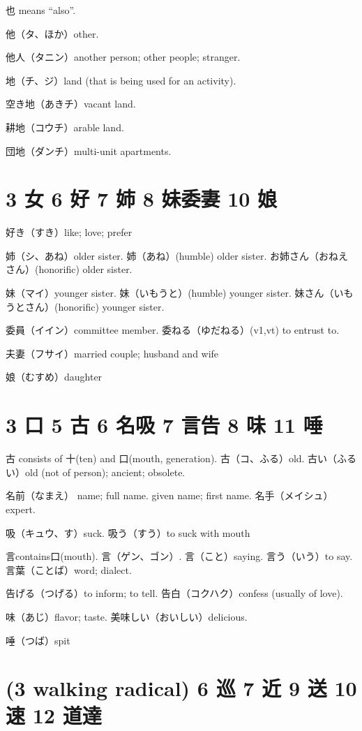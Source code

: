 也 means ``also''.

他（タ、ほか）other.

他人（タニン）another person; other people; stranger.

地（チ、ジ）land (that is being used for an activity).

空き地（あきチ）vacant land.

耕地（コウチ）arable land.

団地（ダンチ）multi-unit apartments.

\section{3 女 6 好 7 姉 8 妹委妻 10 娘}

好き（すき）like; love; prefer

姉（シ、あね）older sister.
姉（あね）(humble) older sister.
お姉さん（おねえさん）(honorific) older sister.

妹（マイ）younger sister.
妹（いもうと）(humble) younger sister.
妹さん（いもうとさん）(honorific) younger sister.

委員（イイン）committee member.
委ねる（ゆだねる）(v1,vt) to entrust to.

夫妻（フサイ）married couple; husband and wife

娘（むすめ）daughter

\section{3 口 5 古 6 名吸 7 言告 8 味 11 唾}

古 consists of 十(ten) and 口(mouth, generation).
古（コ、ふる）old.
古い（ふるい）old (not of person); ancient; obsolete.

名前（なまえ）
name; full name.
given name; first name.
名手（メイシュ）expert.

吸（キュウ、す）suck.
吸う（すう）to suck with mouth

言contains口(mouth).
言（ゲン、ゴン）.
言（こと）saying.
言う（いう）to say.
言葉（ことば）word; dialect.

告げる（つげる）to inform; to tell.
告白（コクハク）confess (usually of love).

味（あじ）flavor; taste.
美味しい（おいしい）delicious.

唾（つば）spit

\section{(3 walking radical) 6 巡 7 近 9 送 10 速 12 道達}

